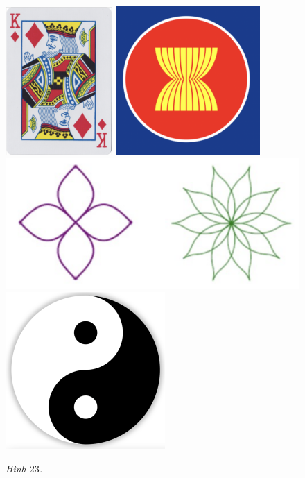 \begin{multicols}{2}
	\begin{figure}[H]
		\vspace*{-5pt}
		\centering
		\captionsetup{labelformat= empty, justification=centering}
		\includegraphics[height= 0.55\linewidth]{22a}
		\includegraphics[height= 0.55\linewidth]{22b}
		\includegraphics[width=\linewidth]{22c}
		\includegraphics[height= 0.45\linewidth]{22d}
		\caption{\small\textit{\color{toancuabi}Hình $23$.}}
		\vspace*{-5pt}
	\end{figure}
\end{multicols}
